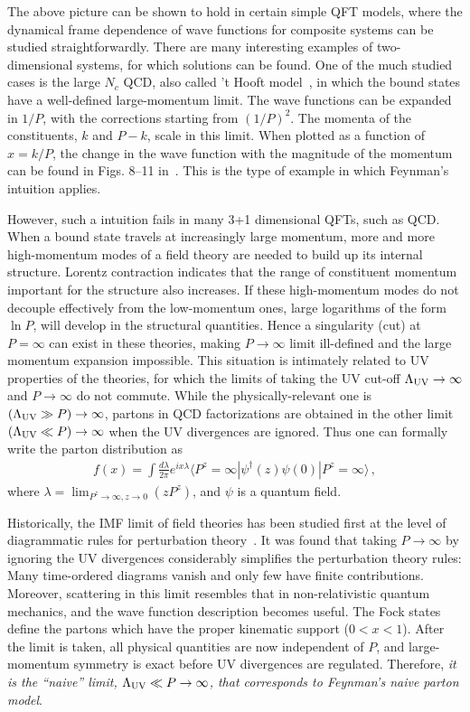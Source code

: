 The above picture can be shown to hold in certain simple
QFT models, where the dynamical frame dependence of wave functions
for composite systems can be studied straightforwardly.
There are many interesting examples of
two-dimensional systems, for which solutions can be found.
One of the much studied cases is the large $N_c$ QCD, also called
't Hooft model~\cite{tHooft:1974pnl}, in which
the bound states have a well-defined large-momentum limit.
The wave functions can be expanded in
$1/P$, with the corrections starting from $(1/P)^2$.
The momenta of the constituents, $k$ and $P-k$, scale in this
limit. When plotted as a function of $x=k/P$, the change in the
wave function with the magnitude of the momentum can be found
in Figs. 8--11 in~\cite{Jia:2017uul}. This is the type of example
in which Feynman's intuition applies.

However, such a intuition fails in many 3+1 dimensional QFTs, such as QCD.
When a bound state travels at increasingly
large momentum, more and more high-momentum modes of a field theory
are needed to build up its internal structure. Lorentz contraction
indicates that the range of constituent momentum important for the
structure also increases. If these high-momentum modes
do not decouple effectively from the low-momentum ones,
large logarithms of the form $\ln P$, will develop in the structural
quantities. Hence a singularity (cut) at $P=\infty$ can
exist in these theories, making $P\to \infty$ limit ill-defined
and the large momentum expansion impossible. This situation
is intimately related to UV properties of the theories, for which the limits of
taking the UV cut-off $\Lambda_{\rm UV}\to \infty$ and $P\to \infty$
do not commute. While the physically-relevant one is
$(\Lambda_{\rm UV}\gg P)\to \infty$, partons
in QCD factorizations
are obtained in the other limit $(\Lambda_{\rm UV}\ll P)\to \infty$ when
the UV divergences are ignored. Thus one can
formally write the parton distribution as
\begin{align}\label{eq:pd}
	f(x) = \int \frac{d\lambda}{2\pi} e^{ix\lambda}\langle P^z=\infty|\psi^\dagger(z) \psi(0)|P^z=\infty\rangle\,,
\end{align}
where $\lambda = \lim_{P^z\to\infty, z\to 0} (zP^z)$,
and $\psi$ is a quantum field.

Historically, the IMF limit
of field theories has been studied first at the level
of diagrammatic rules for perturbation
theory~\cite{Weinberg:1966jm}. It was found that
taking $P\to\infty$ by ignoring the UV divergences considerably simplifies the perturbation
theory rules: Many time-ordered diagrams vanish and only few
have finite contributions. Moreover, scattering in this limit resembles
that in non-relativistic quantum mechanics, and the wave function
description becomes useful.  The Fock states define
the partons which have the proper kinematic support ($0<x<1$).
After the limit is taken, all physical quantities are
now independent of $P$, and large-momentum symmetry is exact
before UV divergences are regulated. Therefore,
{\it it is the ``naive'' limit, $\Lambda_{\rm UV}\ll P\to \infty$,
	that corresponds to Feynman's naive parton model}.

